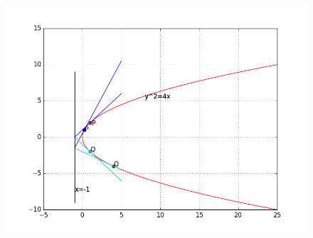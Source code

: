 \documentclass{beamer}
\begin{document}
\begin{frame}

\begin{figure}
\includegraphics[width=\linewidth]{dev.png}
\end{figure}

\end{frame}
\end{document}
